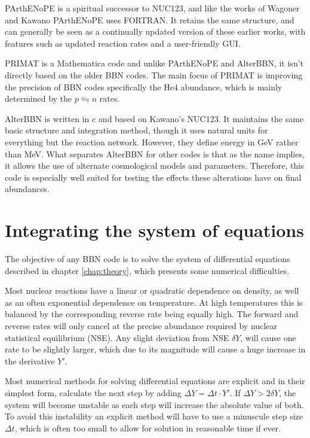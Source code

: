 PArthENoPE\cite{PArthENoPE} is a spiritual successor to NUC123, and like the works of Wagoner and Kawano PArthENoPE uses FORTRAN. It retains the same structure, and can generally be seen as a continually updated version of these earlier works, with features such as updated reaction rates and a user-friendly GUI.

PRIMAT\cite{PRIMAT} is a Mathematica code and unlike PArthENoPE and AlterBBN, it isn't directly based on the older BBN codes. The main focus of PRIMAT is improving the precision of BBN codes specifically the He4 abundance, which is mainly determined by the $p\leftrightharpoons n$ rates. 

AlterBBN is written in c and based on Kawano's NUC123. It maintains the same basic structure and integration method, though it uses natural units for everything but the reaction network. However, they define energy in GeV rather than MeV. What separates AlterBBN for other codes is that as the name implies, it allows the use of alternate cosmological models and parameters. Therefore, this code is especially well suited for testing the effects these alterations have on final abundances.


\section{Integrating the system of equations}
\label{sec:Solving}

The objective of any BBN code is to solve the system of differential equations described in chapter \ref{chap:theory}, which presents some numerical difficulties. 

Most nuclear reactions have a linear or quadratic dependence on density, as well as an often exponential dependence on temperature. At high temperatures this is balanced by the corresponding reverse rate being equally high. The forward and reverse rates will only cancel at the precise abundance required by nuclear statistical equilibrium (NSE). Any slight deviation from NSE $\delta Y$, will cause one rate to be slightly larger, which due to its magnitude will cause a huge increase in the derivative $Y'$.

Most numerical methods for solving differential equations are explicit and in their simplest form, calculate the next step by adding  $\Delta Y = \Delta t \cdot Y' $. 
If $\Delta Y>2\delta Y$, the system will become unstable as each step will increase the absolute value of both. To avoid this instability an explicit method will have to use a minuscule step size $\Delta t$, which is often too small to allow for solution in reasonable time if ever.

